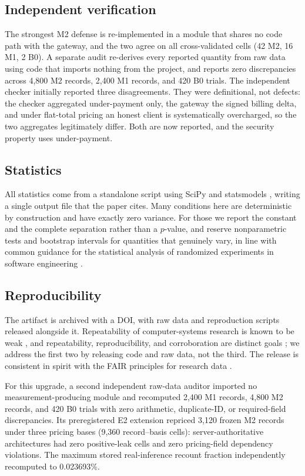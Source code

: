 \documentclass[manuscript,review]{acmart}
\begin{document}
\subsection{Independent verification}
The strongest M2 defense is re-implemented in a module that shares no code path with the
gateway, and the two agree on all cross-validated cells (42 M2, 16 M1, 2 B0). A separate
audit re-derives every reported quantity from raw data using code that imports nothing
from the project, and reports zero discrepancies across 4{,}800 M2 records, 2{,}400 M1
records, and 420 B0 trials. The independent checker initially reported three
disagreements. They were definitional, not defects: the checker aggregated under-payment
only, the gateway the signed billing delta, and under flat-total pricing an honest client
is systematically overcharged, so the two aggregates legitimately differ. Both are now
reported, and the security property uses under-payment.

\subsection{Statistics}
All statistics come from a standalone script using SciPy \citep{scipy} and statsmodels
\citep{statsmodels}, writing a
single output file that the paper cites. Many conditions here are deterministic by
construction and have exactly zero variance. For those we report the constant and the
complete separation rather than a $p$-value, and reserve nonparametric tests and
bootstrap intervals \citep{efron} for quantities that genuinely vary, in line with common
guidance for the statistical analysis of randomized experiments in software engineering
\citep{arcuri}.

\subsection{Reproducibility}
The artifact is archived with a DOI, with raw data and reproduction scripts released
alongside it. Repeatability of computer-systems research is known to be weak
\citep{collberg}, and repeatability, reproducibility, and corroboration are distinct
goals \citep{feitelson}; we address the first two by releasing code and raw data, not the
third. The release is consistent in spirit with the FAIR principles for research data
\citep{fair}.

For this upgrade, a second independent raw-data auditor imported no measurement-producing
module and recomputed 2{,}400 M1 records, 4{,}800 M2 records, and 420 B0 trials with zero
arithmetic, duplicate-ID, or required-field discrepancies. Its preregistered E2 extension
repriced 3{,}120 frozen M2 records under three pricing bases (9{,}360 record--basis cells):
server-authoritative architectures had zero positive-leak cells and zero pricing-field
dependency violations. The maximum stored real-inference recount fraction independently
recomputed to 0.023693\%.
\end{document}
